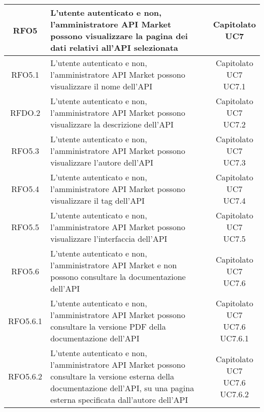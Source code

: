 \begin{longtable}{|c|p{8cm}|c|}
RFO5 & L'utente autenticato e non, l'amministratore API Market possono visualizzare la pagina dei dati relativi all'API selezionata & \makecell*{Capitolato\\UC7} \\
\hline

RFO5.1 & L'utente autenticato e non, l'amministratore API Market possono visualizzare il nome dell'API & \makecell*{Capitolato\\UC7\\UC7.1} \\
\hline

RFDO.2 & L'utente autenticato e non, l'amministratore API Market possono visualizzare la descrizione dell'API & \makecell*{Capitolato\\UC7\\UC7.2} \\
\hline

RFO5.3 & L'utente autenticato e non, l'amministratore API Market possono visualizzare l'autore dell'API & \makecell*{Capitolato\\UC7\\UC7.3} \\
\hline

RFO5.4 & L'utente autenticato e non, l'amministratore API Market possono visualizzare il tag dell'API & \makecell*{Capitolato\\UC7\\UC7.4} \\
\hline

RFO5.5 & L'utente autenticato e non, l'amministratore API Market possono visualizzare l'interfaccia dell'API & \makecell*{Capitolato\\UC7\\UC7.5} \\
\hline

RFO5.6 & L'utente autenticato e non, l'amministratore API Market e non possono consultare la documentazione dell'API & \makecell*{Capitolato\\UC7\\UC7.6} \\
\hline

RFO5.6.1 & L'utente autenticato e non, l'amministratore API Market possono consultare la versione PDF della documentazione dell'API & \makecell*{Capitolato\\UC7\\UC7.6\\UC7.6.1} \\
\hline

RFO5.6.2 &  L'utente autenticato e non, l'amministratore API Market possono consultare la versione esterna della documentazione dell'API, su una pagina esterna specificata dall'autore dell'API  & \makecell*{Capitolato\\UC7\\UC7.6\\UC7.6.2} \\
\hline


\end{longtable}
